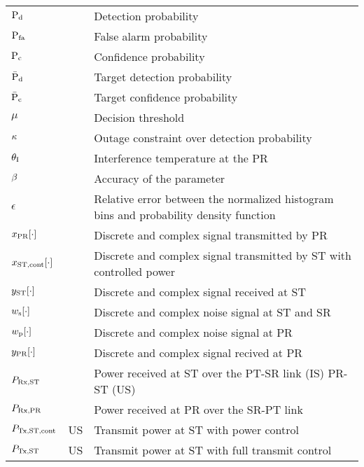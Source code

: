 \begin{longtable}{p{}p{}p{}}
       $\text{P}_{\text{d}}$                   & &             Detection probability \\ 
       $\text{P}_{\text{fa}}$                  & &             False alarm probability \\ 
       $\text{P}_{\text{c}}$                  & &             Confidence probability \\ 
       $\bar{\text{P}}_{\text{d}}$                  & &             Target detection probability \\ 
       $\bar{\text{P}}_{\text{c}}$                 & &             Target confidence probability \\ 
       $\mu$                   & &             Decision threshold \\ 
       $\kappa$                  & &             Outage constraint over detection probability \\ 
       $\theta_{\text{I}}$                  & &             Interference temperature at the PR \\ 
       $\beta$	               & &             Accuracy of the parameter \\	
       $\epsilon$	       & &             Relative error between the normalized histogram bins and probability density function  \\	

	$x_{\text{PR}}[\cdot]$       & &             Discrete and complex signal transmitted by PR \\	
	$x_{\text{ST,cont}}[\cdot]$       & &             Discrete and complex signal transmitted by ST with controlled power \\	

	$y_{\text{ST}}[\cdot]$       & &             Discrete and complex signal received at ST \\	
	
	$w_{\text{s}}[\cdot]$       & &             Discrete and complex noise signal at ST and SR\\	
	$w_{\text{p}}[\cdot]$       & &             Discrete and complex noise signal at PR \\	

	$y_{\text{PR}}[\cdot]$       & &             Discrete and complex signal recived at PR \\	
	$P_{\text{Rx,ST}}$  		& &		Power received at ST over the PT-SR link (IS) PR-ST (US) \\ 
	$P_{\text{Rx,PR}}$  		& &		Power received at PR over the SR-PT link \\

	$P_{\text{Tx,ST,cont}}$	  		& US &  	Transmit power at ST with power control \\
	$P_{\text{Tx,ST}}$ 		& US &  	Transmit power at ST with full transmit control \\


\end{longtable}
